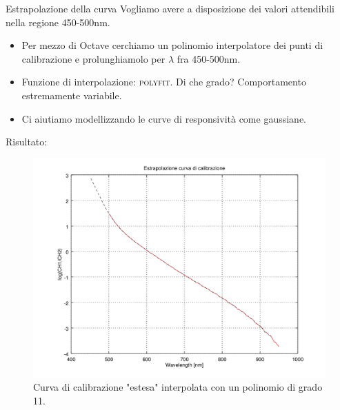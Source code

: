 \documentclass{beamer}
\begin{document}
\begin{frame}{Estrapolazione della curva}
\fontsize{9}{11}
Vogliamo avere a disposizione dei valori attendibili nella regione 450-500nm.
\begin{itemize}
\item Per mezzo di Octave cerchiamo un polinomio interpolatore dei punti di calibrazione e prolunghiamolo per $\lambda$ fra 450-500nm. \item Funzione di interpolazione: \textsc{polyfit}. Di che grado? Comportamento estremamente variabile.
\item Ci aiutiamo modellizzando le curve di responsività come gaussiane.
\end{itemize}


\begin{figure}
\centering
{}
\end{figure}


\end{frame}

\begin{frame}
Risultato:
\begin{figure}
\centering
\includegraphics[width=0.7\linewidth]{./calibrazione_ext}
\caption{Curva di calibrazione "estesa" interpolata con un polinomio di grado 11.}
\label{fig:calibrazione_ext}
\end{figure}
\end{frame}
\end{document}
